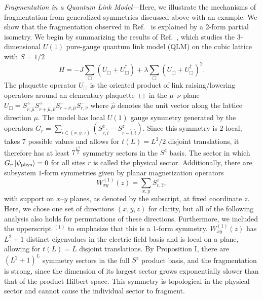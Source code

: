 \documentclass[
 reprint,
 amsmath,amssymb,
 aps,floatfix,prl,superscriptaddress
]{revtex4-2}
\newcounter{paranum}
\renewcommand{\theparanum}{\Roman{paranum}} %
\newcommand{\pnum}[1]{%
  \textit{#1}---}
\begin{document}
\pnum{Fragmentation in a Quantum Link Model}Here, we illustrate the mechanisms of fragmentation from generalized symmetries discussed above with an example. We show that the fragmentation observed in Ref.~\cite{Steinegger2025} is explained by a 2-form partial isometry. 
We begin by summarizing the results of Ref.~\cite{Steinegger2025}, which studies the 3-dimensional $U(1)$ pure-gauge quantum link model (QLM) on the cubic lattice with $S=1/2$
\begin{equation}
    H = - J \sum_\Box  \left( U_\Box + U_\Box^\dagger \right) + \lambda \sum_\Box  \left( U_\Box + U_\Box^\dagger \right)^2.
\end{equation}
The plaquette operator $U_{\Box}$ is the oriented product of link raising/lowering operators around an elementary plaquette $\Box$ in the $\mu$--$\nu$ plane 
$U_\Box = S^+_{r,\hat{\mu}} S^+_{r + \hat{\mu},\hat{\nu}} S^-_{r + \hat{\nu},\hat{\mu}} S^-_{r,\hat{\nu}}$
where $\hat{\mu}$ denotes the unit vector along the lattice direction $\mu$.
The model has local $U(1)$ gauge symmetry generated by the operators
$G_r = \sum_{\hat{i} \in (\hat{x},\hat{y},\hat{z})} \left(S^z_{r,\hat{i}} -  S^z_{r-\hat{i},\hat{i}}\right)$.
Since this symmetry is 2-local, takes 7 possible values and allows for $t(L) = L^3/2$ disjoint translations, it therefore has at least $7^{\frac{L^3}{2}}$ symmetry sectors in the $S^z$ basis. The sector in which $G_r \ket{\psi_\mathrm{phys}} = 0$ for all sites $r$ is called the physical sector.
Additionally, there are subsystem $1$-form symmetries given by planar magnetization operators
\begin{equation}
    W^{(1)}_{xy}(z) = \sum_{x,y} S^z_{r,\hat{z}},
\end{equation}
with support on $x$--$y$ planes, as denoted by the subscript, at fixed coordinate $z$. Here, we chose one set of directions $(x,y,z)$ for clarity, but all of the following analysis also holds for permutations of these directions. Furthermore, we included the upperscript $^{(1)}$ to emphasize that this is a 1-form symmetry. $W^{(1)}_{xy}(z)$ has $L^2+1$ distinct eigenvalues in the electric field basis and is local on a plane, allowing for $t(L) = L$ disjoint translations. By Proposition I, there are $(L^2+1)^L$ symmetry sectors in the full $S^z$ product basis, and the fragmentation is strong, since the dimension of its largest sector grows exponentially slower than that of the product Hilbert space. This symmetry is topological in the physical sector and cannot cause the individual sector to fragment.
\end{document}
